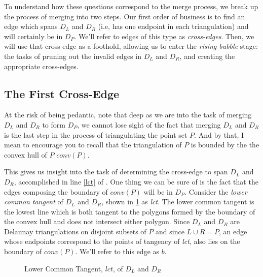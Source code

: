 \documentclass[12pt,twoside]{reedthesis}
\begin{document}
    To understand how these questions correspond to the merge process, we break up the process of merging into two steps. Our first order of business is to find an edge which spans $D_{L}$ and $D_{R}$ (i.e, has one endpoint in each triangulation) and will certainly be in $D_{P}$. We'll refer to edges of this type as \emph{cross-edges}. Then, we will use that cross-edge as a foothold, allowing us to enter the \emph{rising bubble} stage: the tasks of pruning out the invalid edges in $D_{L}$ and $D_{R}$, and creating the appropriate cross-edges.\par 

    \subsection{The First Cross-Edge} %
    \label{sub:the_first_cross_edge}

      At the risk of being pedantic, note that deep as we are into the task of merging $D_{L}$ and $D_{R}$ to form $D_{P}$, we cannot lose sight of the fact that merging $D_{L}$ and $D_{R}$ is the last step in the process of triangulating the point set $P$. And by that, I mean to encourage you to recall that the triangulation of $P$ is bounded by the the convex hull of $P$ $\textit{conv}(P)$.\par 

      This gives us insight into the task of determining the  cross-edge to span $D_{L}$ and $D_{R}$, accomplished in line \ref{lct} of . One thing we can be sure of is the fact that the edges composing the boundary of $\textit{conv}(P)$ will be in $D_{P}$. Consider the \emph{lower common tangent} of $D_{L}$ and $D_{R}$, shown in \cref{fig:lct} as \textit{lct}. The lower common tangent is the lowest line which is both tangent to the polygons formed by the boundary of the convex hull and does not intersect either polygon. Since $D_{L}$ and $D_{R}$ are Delaunay triangulations on disjoint subsets of $P$ and since $L \cup R = P$, an edge whose endpoints correspond to the points of tangency of \textit{lct}, also lies on the boundary of $\textit{conv}(P)$. We'll refer to this edge as $b$.\par

      \begin{figure}[!htb]
        \centering
        
        \caption{Lower Common Tangent, $lct$, of $D_{L}$ and $D_{R}$}
        \label{fig:lct}
      \end{figure}
\end{document}
